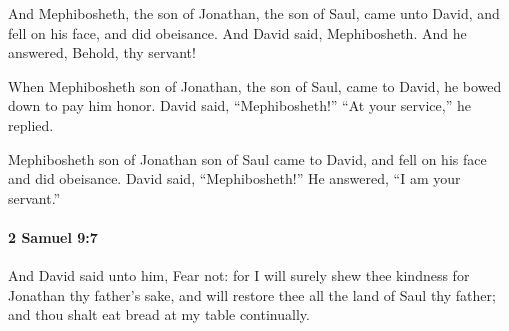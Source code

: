 			\begin{versebox}
					\item[BHS] 
					\item[ASV] And Mephibosheth, the son of Jonathan, the son of Saul, came unto David, and fell on his face, and did obeisance. And David said, Mephibosheth. And he answered, Behold, thy servant!
					\item[NIV] When Mephibosheth son of Jonathan, the son of Saul, came to David, he bowed down to pay him honor. David said, “Mephibosheth!” “At your service,” he replied.
					\item[NRSV] Mephibosheth son of Jonathan son of Saul came to David, and fell on his face and did obeisance. David said, “Mephibosheth!” He answered, “I am your servant.”
			\end{versebox}

		\paragraph{2 Samuel 9:7} %
			\label{2SAMUEL-9-7}

			And David said unto him, Fear not: for I will surely shew thee kindness for Jonathan thy father’s sake, and will restore thee all the land of Saul thy father; and thou shalt eat bread at my table continually.

